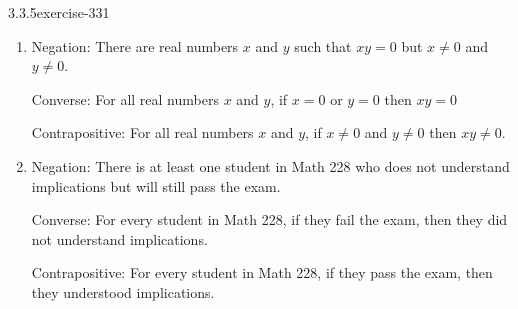 \documentclass[twoside,11pt,]{book}
\numberwithin{equation}{chapter}
\begin{document}
\begin{divisionsolution}{3.3.5}{}{exercise-331}
\begin{enumerate}[label=(\alph*)]
\item\hypertarget{li-2166}{}\hypertarget{p-4260}{}%
Negation: There are real numbers \(x\) and \(y\) such that \(xy = 0\) but \(x \ne 0\) and \(y \ne 0\).%
\par
\hypertarget{p-4261}{}%
Converse: For all real numbers \(x\) and \(y\), if \(x = 0\) or \(y = 0\) then \(xy = 0\)%
\par
\hypertarget{p-4262}{}%
Contrapositive: For all real numbers \(x\) and \(y\), if \(x \ne 0\) and \(y \ne 0\) then \(xy \ne 0\).%
\item\hypertarget{li-2167}{}\hypertarget{p-4263}{}%
Negation: There is at least one student in Math 228 who does not understand implications but will still pass the exam.%
\par
\hypertarget{p-4264}{}%
Converse: For every student in Math 228, if they fail the exam, then they did not understand implications.%
\par
\hypertarget{p-4265}{}%
Contrapositive: For every student in Math 228, if they pass the exam, then they understood implications.%
\end{enumerate}
%
\end{divisionsolution}%
\end{document}
